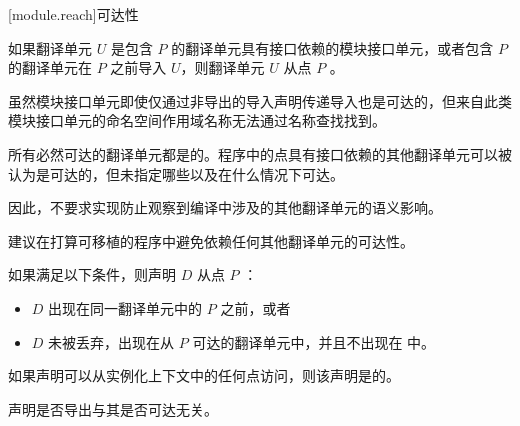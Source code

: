 [module.reach]{可达性}

\pnum
如果翻译单元 $U$ 是包含 $P$ 的翻译单元具有接口依赖的模块接口单元，或者包含 $P$ 的翻译单元在 $P$ 之前导入 $U$，则翻译单元 $U$ 从点 $P$ 。
\begin{note}
虽然模块接口单元即使仅通过非导出的导入声明传递导入也是可达的，但来自此类模块接口单元的命名空间作用域名称无法通过名称查找找到。
\end{note}

\pnum
所有必然可达的翻译单元都是的。程序中的点具有接口依赖的其他翻译单元可以被认为是可达的，但未指定哪些以及在什么情况下可达。
\begin{footnote}
因此，不要求实现防止观察到编译中涉及的其他翻译单元的语义影响。
\end{footnote}
\begin{note}
建议在打算可移植的程序中避免依赖任何其他翻译单元的可达性。
\end{note}

\pnum
如果满足以下条件，则声明 $D$ 从点 $P$ ：
\begin{itemize}
\item $D$ 出现在同一翻译单元中的 $P$ 之前，或者
\item $D$ 未被丢弃，出现在从 $P$ 可达的翻译单元中，并且不出现在  中。
\end{itemize}
如果声明可以从实例化上下文中的任何点访问，则该声明是的。
\begin{note}
声明是否导出与其是否可达无关。
\end{note}

